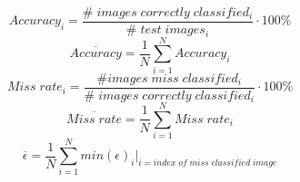 \begin{equation}
    Accuracy_i = \frac{\# \; images \; correctly \; classified_i}{\# \; test \; images_i} \cdot 100 \%
\end{equation}
\begin{equation}
    \overline{Accuracy} = \frac{1}{N}  \sum_{i=1}^{N}{Accuracy_i}
\end{equation}
\begin{equation}
    Miss \; rate_i = \frac{\# images \; miss \; classified_i}{\# \; images \; correctly \; classified_i} \cdot 100 \%
\end{equation}
\begin{equation}
    \overline{Miss \; rate} = \frac{1}{N}  \sum_{i=1}^{N}{Miss \; rate_i}
\end{equation}
\begin{equation}
    \overline{\epsilon} = \frac{1}{N}  \sum_{i=1}^{N}{min(\epsilon)_i} |_{i = index \; of \; miss \; classified \; image}
\end{equation}